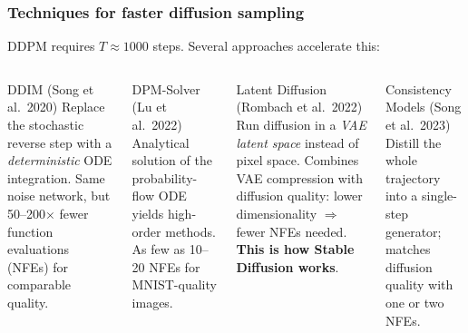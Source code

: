 \documentclass{beamer}
\begin{document}
\begin{frame}
\frametitle{Techniques for faster diffusion sampling}

DDPM requires $T\approx 1000$ steps.  Several approaches accelerate this:

\begin{columns}
\begin{block}{DDIM (Song et al.\ 2020)}
Replace the stochastic reverse step with a \emph{deterministic} ODE integration.
Same noise network, but 50--200$\times$ fewer function evaluations (NFEs)
for comparable quality.
\end{block}
\begin{block}{DPM-Solver (Lu et al.\ 2022)}
Analytical solution of the probability-flow ODE yields high-order methods.
As few as 10--20 NFEs for MNIST-quality images.
\end{block}

\begin{block}{Latent Diffusion (Rombach et al.\ 2022)}
Run diffusion in a \emph{VAE latent space} instead of pixel space.
Combines VAE compression with diffusion quality:
lower dimensionality $\Rightarrow$ fewer NFEs needed.
\textbf{This is how Stable Diffusion works}.
\end{block}
\begin{block}{Consistency Models (Song et al.\ 2023)}
Distill the whole trajectory into a single-step generator;
matches diffusion quality with one or two NFEs.
\end{block}
\end{columns}
\end{frame}
\end{document}

